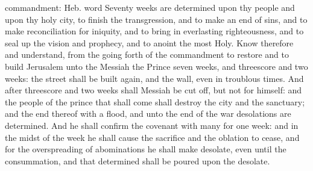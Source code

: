 {{commandment: Heb. word}
Seventy
weeks are
determined upon thy
people and upon thy
holy
city, to
finish the
transgression, and to make an
end of
sins, and to make
reconciliation for
iniquity, and to bring
in
everlasting
righteousness, and to seal
up the
vision and
prophecy, and to
anoint the
most
Holy.
Know therefore and
understand,
{} from the going
forth of the
commandment to
restore and to
build
Jerusalem unto the
Messiah the
Prince
{}
seven
weeks, and
threescore and
two
weeks: the
street shall be
built
again, and the
wall, even in
troublous
times.
And
after
threescore and
two
weeks shall
Messiah be cut
off, but not for himself: and the
people of the
prince that shall
come shall
destroy the
city and the
sanctuary; and the
end thereof
{} with a
flood, and unto the
end of the
war
desolations are
determined.
And he shall
confirm the
covenant with
many for
one
week: and in the
midst of the
week he shall cause the
sacrifice and the
oblation to
cease, and for the
overspreading of
abominations he shall make
{}
desolate, even until the
consummation, and that
determined shall be
poured upon the
desolate.

}
